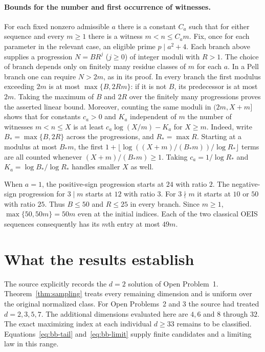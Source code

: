 \documentclass[11pt,a4paper]{article}
\theoremstyle{remark}\newtheorem{remark}[theorem]{Remark}
\numberwithin{equation}{section}
\begin{document}
\paragraph{Bounds for the number and first occurrence of witnesses.}
For each fixed nonzero admissible $a$ there is a constant $C_a$ such
that for either sequence and every $m\ge1$ there is a witness
$m<n\le C_a m$.
Fix, once for each parameter in the relevant case, an eligible prime
$p\mid a^2+4$. Each branch above supplies a progression
$N=B R^j$ ($j\ge0$) of integer moduli with $R>1$.
The choice of branch depends only on finitely many residue classes of
$m$ for each $a$. In a Pell branch one can require $N>2m$, as in its
proof. In every branch the first modulus exceeding $2m$ is at most
$\max\{B,2Rm\}$: if it is not $B$, its predecessor is at most $2m$.
Taking the maximum of $B$ and $2R$ over the finitely many progressions
proves the asserted linear bound. Moreover, counting the same moduli
in $(2m,X+m]$ shows that for constants $c_a>0$ and $K_a$ independent
of $m$ the number of witnesses $m<n\le X$ is at least
$c_a\log(X/m)-K_a$ for $X\ge m$.
Indeed, write $B_* =\max\{B,2R\}$ across the progressions,
and $R_* =\max R$. Starting at a modulus at most $B_* m$,
the first $1+\lfloor\log((X+m)/(B_*m))/\log R_*\rfloor$ terms
are all counted whenever $(X+m)/(B_*m)\ge1$. Taking
$c_a=1/\log R_*$ and $K_a=\log B_*/\log R_*$ handles smaller $X$
as well.

When $a=1$, the positive-sign progression starts at $24$ with ratio $2$.
The negative-sign progression for $3\mid m$ starts at $12$ with
ratio $3$. For $3\nmid m$ it starts at $10$ or $50$ with ratio $25$.
Thus $B\le50$ and $R\le25$ in every branch. Since $m\ge1$,
$\max\{50,50m\}=50m$ even at the initial indices. Each of the two
classical OEIS sequences consequently has its $m$th entry at most $49m$.

\section{What the results establish}
The source explicitly records the $d=2$ solution of Open Problem~1. Theorem~\ref{thm:sampling} treats every remaining dimension and is uniform over the original normalized class. For Open Problems~2 and 3 the source had treated $d=2,3,5,7$. The additional dimensions evaluated here are $4,6$ and $8$ through $32$. The exact maximizing index at each individual $d\ge33$ remains to be classified. Equations~\eqref{eq:bb-tail} and~\eqref{eq:bb-limit} supply finite candidates and a limiting law in this range.
\end{document}
